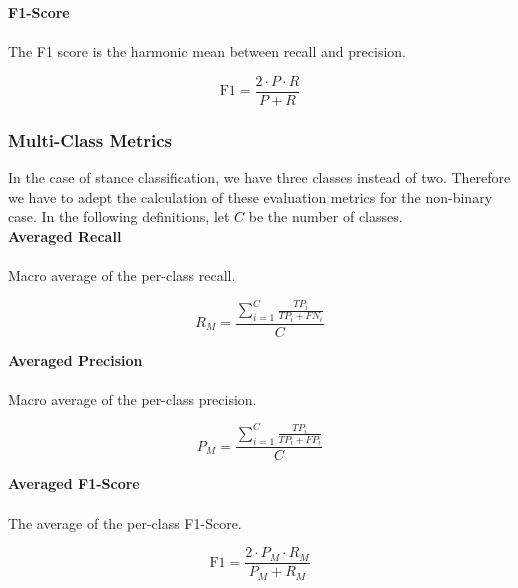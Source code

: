 \textbf{F1-Score} \\ \\
The F1 score is the harmonic mean between recall and precision.

\begin{equation}
	\text{F1} = \frac{2 \cdot P \cdot R}{P + R}
\end{equation}

\subsubsection{Multi-Class Metrics}
In the case of stance classification, we have three classes instead of two. Therefore we have to adept the calculation of these evaluation metrics for the non-binary case. In the following definitions, let $C$ be the number of classes. \\

\textbf{Averaged Recall} \\ \\
Macro average of the per-class recall.

\begin{equation}
	R_M = \frac{\sum\limits_{i=1}^{C} \frac{TP_i}{TP_i + FN_i}}{C}
\end{equation}

\textbf{Averaged Precision} \\ \\
Macro average of the per-class precision.

\begin{equation}
	P_M = \frac{\sum\limits_{i=1}^{C} \frac{TP_i}{TP_i + FP_i}}{C}
\end{equation}

\textbf{Averaged F1-Score} \\ \\
The average of the per-class F1-Score.

\begin{equation}
	\text{F1} = \frac{2 \cdot P_M \cdot R_M}{P_M + R_M}
\end{equation}
